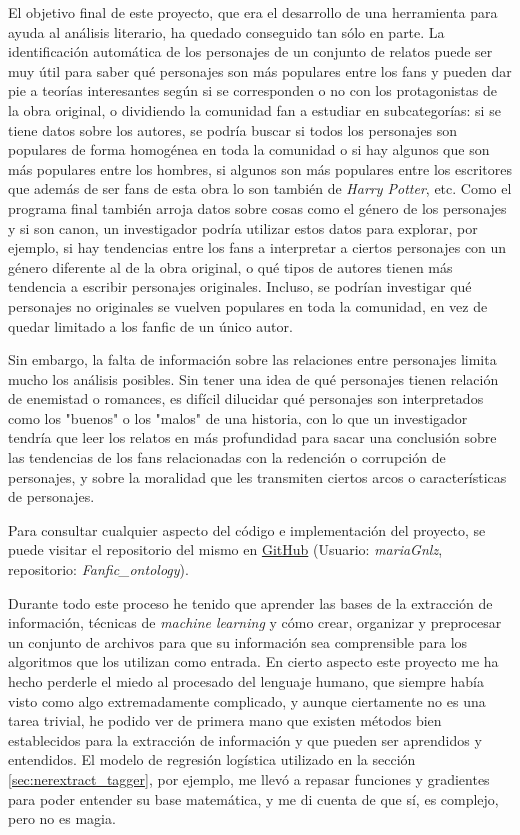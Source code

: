\documentclass{pre-tfg}
\begin{document}
El objetivo final de este proyecto, que era el desarrollo de una herramienta para ayuda al análisis literario, ha quedado conseguido tan sólo en parte. La identificación automática de los personajes de un conjunto de relatos puede ser muy útil para saber qué personajes son más populares entre los fans y pueden dar pie a teorías interesantes según si se corresponden o no con los protagonistas de la obra original, o dividiendo la comunidad fan a estudiar en subcategorías: si se tiene datos sobre los autores, se podría buscar si todos los personajes son populares de forma homogénea en toda la comunidad o si hay algunos que son más populares entre los hombres, si algunos son más populares entre los escritores que además de ser fans de esta obra lo son también de \textit{Harry Potter}, etc. Como el programa final también arroja datos sobre cosas como el género de los personajes y si son canon, un investigador podría utilizar estos datos para explorar, por ejemplo, si hay tendencias entre los fans a interpretar a ciertos personajes con un género diferente al de la obra original, o qué tipos de autores tienen más tendencia a escribir personajes originales. Incluso, se podrían investigar qué personajes no originales se vuelven populares en toda la comunidad, en vez de quedar limitado a los fanfic de un único autor.

Sin embargo, la falta de información sobre las relaciones entre personajes limita mucho los análisis posibles. Sin tener una idea de qué personajes tienen relación de enemistad o romances, es difícil dilucidar qué personajes son interpretados como los "buenos" o los "malos" de una historia, con lo que un investigador tendría que leer los relatos en más profundidad para sacar una conclusión sobre las tendencias de los fans relacionadas con la redención o corrupción de personajes, y sobre la moralidad que les transmiten ciertos arcos o características de personajes.

Para consultar cualquier aspecto del código e implementación del proyecto, se puede visitar el repositorio del mismo en \href{https://www.github.com/mariaGnlz/Fanfic_ontology}{GitHub} (Usuario: \textit{mariaGnlz}, repositorio: \textit{Fanfic\_ontology}).

Durante todo este proceso he tenido que aprender las bases de la extracción de información, técnicas de \textit{machine learning} y cómo crear, organizar y preprocesar un conjunto de archivos para que su información sea comprensible para los algoritmos que los utilizan como entrada. En cierto aspecto este proyecto me ha hecho perderle el miedo al procesado del lenguaje humano, que siempre había visto como algo extremadamente complicado, y aunque ciertamente no es una tarea trivial, he podido ver de primera mano que existen métodos bien establecidos para la extracción de información y que pueden ser aprendidos y entendidos. El modelo de regresión logística utilizado en la sección \ref{sec:nerextract_tagger}, por ejemplo, me llevó a repasar funciones y gradientes para poder entender su base matemática, y me di cuenta de que sí, es complejo, pero no es magia.
\end{document}

